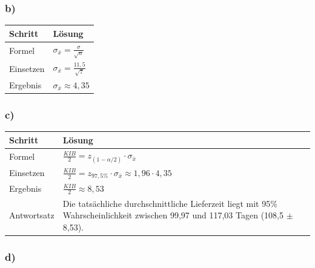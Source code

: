 \documentclass[
  11pt,
  ngerman,
  a4paper,
]{report}
\begin{document}
\hypertarget{b-15}{%
\subsubsection{b)}\label{b-15}}

\begin{table}[H]
\centering
\begin{tabular}{ll}
\toprule
\textbf{Schritt} & \textbf{Lösung}\\
\midrule
Formel & $\sigma_{\bar{x}}=\frac{\sigma}{\sqrt{n}}$\\
Einsetzen & $\sigma_{\bar{x}}=\frac{11{,}5}{\sqrt{7}}$\\
Ergebnis & $\sigma_{\bar{x}}\approx4{,}35$\\
\bottomrule
\end{tabular}
\end{table}

\hypertarget{c-12}{%
\subsubsection{c)}\label{c-12}}

\begin{table}[H]
\centering
\begin{tabular}{ll}
\toprule
\textbf{Schritt} & \textbf{Lösung}\\
\midrule
Formel & $\frac{\mathit{KIB}}{2} = z_{(1-\alpha/2)} \cdot \sigma_{\bar{x}}$\\
Einsetzen & $\frac{\mathit{KIB}}{2} = z_{97{,}5\%} \cdot \sigma_{\bar{x}} \approx 1{,}96 \cdot 4{,}35$\\
Ergebnis & $\frac{\mathit{KIB}}{2} \approx 8{,}53$\\
Antwortsatz & Die tatsächliche durchschnittliche Lieferzeit liegt mit 95\% Wahrscheinlichkeit zwischen 99,97 und 117,03 Tagen (108,5 $\pm$ 8,53).\\
\bottomrule
\end{tabular}
\end{table}

\hypertarget{d-6}{%
\subsubsection{d)}\label{d-6}}
\end{document}
